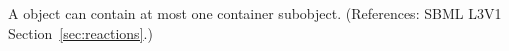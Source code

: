 A \KineticLaw object can contain at most one \ListOfLocalParameters
container subobject.  (References: SBML L3V1 Section~\ref{sec:reactions}.)
